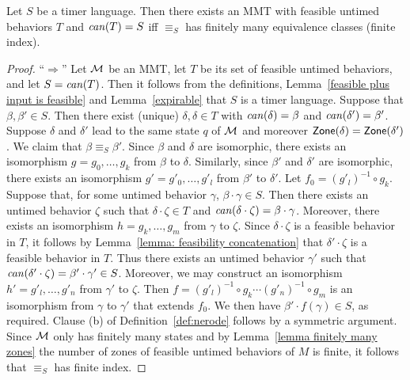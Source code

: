 \begin{theorem}
\label{Myhill Nerode}
Let $S$ be a timer language.
Then there exists an MMT with feasible untimed behaviors $T$ and $\mathit{can}({T}) = S$ iff 
$\equiv_S$ has finitely many equivalence classes (finite index).
\end{theorem}
\begin{proof} 

``$\Rightarrow$'' Let ${\mathcal M}$ be an MMT, let $T$ be its set of feasible untimed behaviors, and let $S = \mathit{can}({T})$.
Then it follows from the definitions, Lemma~\ref{feasible plus input is feasible} and Lemma~\ref{expirable} that $S$ is a timer language.
Suppose that $\beta, \beta' \in S$.
Then there exist (unique) $\delta, \delta \in T$ with
$\mathit{can}({\delta})=\beta$ and $\mathit{can}({\delta'})=\beta'$.
Suppose $\delta$ and $\delta'$ lead to the same state $q$ of ${\mathcal M}$ and moreover $\mathsf{Zone}({\delta}) = \mathsf{Zone}({\delta'})$.
We claim that $\beta \equiv_S \beta'$.
Since $\beta$ and $\delta$ are isomorphic, there exists an isomorphism $g = g_0 ,\ldots, g_k$ from $\beta$ to $\delta$.
Similarly, since $\beta'$ and $\delta'$ are isomorphic, there exists an isomorphism $g' = g'_0 ,\ldots, g'_l$ from $\beta'$ to $\delta'$.
Let $f_0 = (g'_l)^{-1} \circ g_k$.
Suppose that, for some untimed behavior $\gamma$, $\beta \cdot \gamma \in S$.
Then there exists an untimed behavior $\zeta$ such that $\delta \cdot \zeta \in T$ and $\mathit{can}({\delta \cdot \zeta}) = \beta \cdot \gamma$.
Moreover, there exists an isomorphism $h = g_k ,\ldots, g_m$ from $\gamma$ to $\zeta$.
Since $\delta \cdot \zeta$ is a feasible behavior in $T$, it follows by Lemma~\ref{lemma: feasibility concatenation} that
$\delta' \cdot \zeta$ is a feasible behavior in $T$.
Thus there exists an untimed behavior $\gamma'$ such that $\mathit{can}({\delta' \cdot \zeta}) = \beta' \cdot \gamma' \in S$.
Moreover, we may construct an isomorphism $h' = g'_l ,\ldots, g'_n$ from $\gamma'$ to $\zeta$.
Then $f = (g'_l)^{-1} \circ g_k \cdots (g'_n)^{-1} \circ g_m$ is an isomorphism from $\gamma$ to $\gamma'$ that extends $f_0$.
We then have $\beta' \cdot f(\gamma) \in S$, as required.
Clause (b) of Definition~\ref{def:nerode} follows by a symmetric argument.
Since ${\mathcal M}$ only has finitely many states and by Lemma~\ref{lemma finitely many zones} the number of zones of feasible
untimed behaviors of $M$ is finite, it follows that $\equiv_S$ has finite index.


\end{proof}
